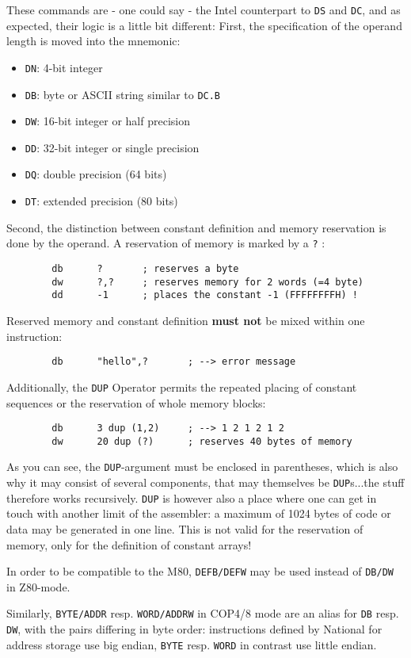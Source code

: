 \documentclass[12pt,twoside]{report}
\newcommand{\bb}[1]{{\bf #1}}
\newcommand{\tty}[1]{{\tt #1}}
\begin{document}
These commands are - one could say - the Intel counterpart to \tty{DS} and
\tty{DC}, and as expected, their logic is a little bit different: First,
the specification of the operand length is moved into the mnemonic:
\begin{itemize}
\item{\tty{DN}: 4-bit integer}
\item{\tty{DB}: byte or ASCII string similar to \tty{DC.B}}
\item{\tty{DW}: 16-bit integer or half precision}
\item{\tty{DD}: 32-bit integer or single precision}
\item{\tty{DQ}: double precision   (64 bits)}
\item{\tty{DT}: extended precision (80 bits)}
\end{itemize}
Second, the distinction between constant definition and memory
reservation is done by the operand.  A reservation of memory is
marked by a \tty{?} :
\begin{verbatim}
        db      ?       ; reserves a byte
        dw      ?,?     ; reserves memory for 2 words (=4 byte)
        dd      -1      ; places the constant -1 (FFFFFFFFH) !
\end{verbatim}
Reserved memory and constant definition \bb{must not} be mixed within one
instruction:
\begin{verbatim}
        db      "hello",?       ; --> error message
\end{verbatim}
Additionally, the \tty{DUP} Operator permits the repeated placing of
constant sequences or the reservation of whole memory blocks:
\begin{verbatim}
        db      3 dup (1,2)     ; --> 1 2 1 2 1 2
        dw      20 dup (?)      ; reserves 40 bytes of memory
\end{verbatim}
As you can see, the \tty{DUP}-argument must be enclosed in parentheses,
which is also why it may consist of several components, that may
themselves be \tty{DUP}s...the stuff therefore works recursively.
\tty{DUP} is however also a place where one can get in touch with another
limit of the assembler: a maximum of 1024 bytes of code or data may be
generated in one line.  This is not valid for the reservation of memory,
only for the definition of constant arrays!

In order to be compatible to the M80, \tty{DEFB/DEFW} may be used instead of
\tty{DB/DW} in Z80-mode.

Similarly, \tty{BYTE/ADDR} resp. \tty{WORD/ADDRW} in COP4/8 mode are an
alias for \tty{DB} resp. \tty{DW}, with the pairs differing in byte order:
instructions defined by National for address storage use big endian,
\tty{BYTE} resp. \tty{WORD} in contrast use little endian.
\end{document}
